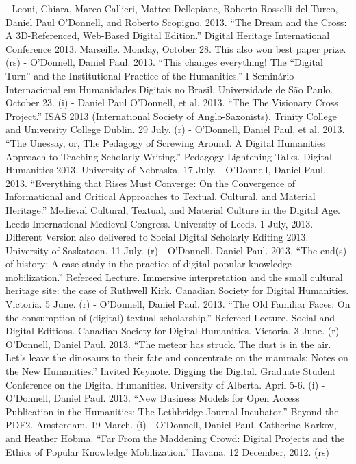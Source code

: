 - Leoni\*, Chiara, Marco Callieri, Matteo Dellepiane, Roberto Rosselli del Turco, Daniel Paul O’Donnell, and Roberto Scopigno. 2013. “The Dream and the Cross: A 3D-Referenced, Web-Based Digital Edition.” Digital Heritage International Conference 2013. Marseille. Monday, October 28. This also won best paper prize. (rs)
- O'Donnell, Daniel Paul. 2013. “This changes everything! The “Digital Turn” and the Institutional Practice of the Humanities.” I Seminário Internacional em Humanidades Digitais no Brasil. Universidade de São Paulo. October 23. (i)
- Daniel Paul O'Donnell, et al. 2013. “The The Visionary Cross Project.” ISAS 2013 (International Society of Anglo-Saxonists). Trinity College and University College Dublin.  29 July. (r)
- O'Donnell, Daniel Paul, et al. 2013. “The Unessay, or, The Pedagogy of Screwing Around. A Digital Humanities Approach to Teaching Scholarly Writing.” Pedagogy Lightening Talks. Digital Humanities 2013. University of Nebraska. 17 July.
- O'Donnell, Daniel Paul. 2013. “Everything that Rises Must Converge: On the Convergence of Informational and Critical Approaches to Textual, Cultural, and Material Heritage.” Medieval Cultural, Textual, and Material Culture in the Digital Age. Leeds International Medieval Congress. University of Leeds. 1 July, 2013. Different Version also delivered to Social Digital Scholarly Editing 2013. University of Saskatoon. 11 July. (r)
- O'Donnell, Daniel Paul. 2013. “The end(s) of history: A case study in the practice of digital popular knowledge mobilization.” Refereed Lecture. Immersive interpretation and the small cultural heritage site: the case of Ruthwell Kirk. Canadian Society for Digital Humanities. Victoria. 5 June. (r)
- O'Donnell, Daniel Paul. 2013. “The Old Familiar Faces: On the consumption of (digital) textual scholarship.” Refereed Lecture. Social and Digital Editions. Canadian Society for Digital Humanities. Victoria. 3 June. (r)
- O'Donnell, Daniel Paul. 2013. “The meteor has struck. The dust is in the air. Let’s leave the dinosaurs to their fate and concentrate on the mammals: Notes on the New Humanities.” Invited Keynote. Digging the Digital. Graduate Student Conference on the Digital Humanities. University of Alberta. April 5-6. (i)
- O'Donnell, Daniel Paul. 2013. “New Business Models for Open Access Publication in the Humanities: The Lethbridge Journal Incubator.” Beyond the PDF2. Amsterdam. 19 March. (i)
- O'Donnell, Daniel Paul, Catherine Karkov, and Heather Hobma\*. “Far From the Maddening Crowd: Digital Projects and the Ethics of Popular Knowledge Mobilization.” Havana. 12 December, 2012. (rs)
